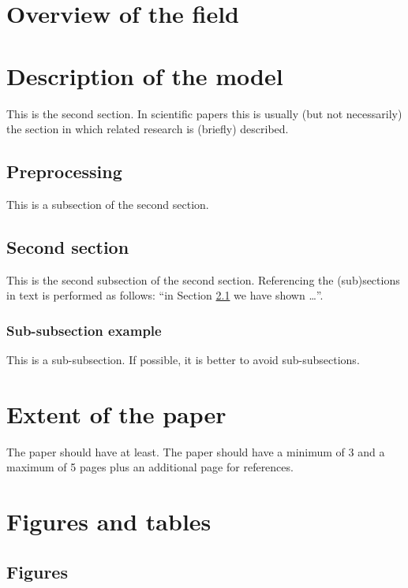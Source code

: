 \documentclass[10pt, a4paper]{article}
\begin{document}
\section{Overview of the field}


\section{Description of the model}

This is the second section. In scientific papers this is usually (but not necessarily) the section in which related research is (briefly) described.

\subsection{Preprocessing}
\label{sec:first}

This is a subsection of the second section.

\subsection{Second section}

This is the second subsection of the second section. Referencing the (sub)sections in text is performed as follows: ``in Section \ref{sec:first} we have shown \dots''.

\subsubsection{Sub-subsection example} 

This is a sub-subsection. If possible, it is better to avoid sub-subsections. 

\section{Extent of the paper}

The paper should have at least. The paper should have a minimum of 3 and a maximum of 5 pages plus an additional page for references.

\section{Figures and tables}

\subsection{Figures}
\end{document}
